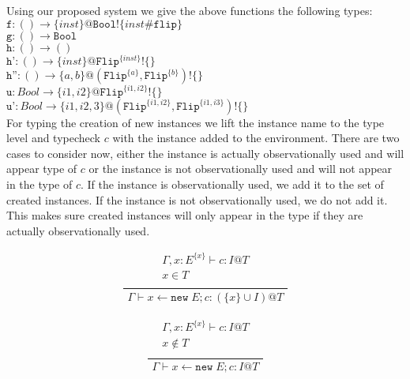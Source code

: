 \documentclass[12pt]{article}
\begin{document}
Using our proposed system we give the above functions the following types:\\
$\texttt{f} : () \rightarrow \{inst\}@\texttt{Bool}!\{inst\#\texttt{flip}\}$\\
$\texttt{g} : () \rightarrow \texttt{Bool}$\\
$\texttt{h} : () \rightarrow ()$\\
$\texttt{h'} : () \rightarrow \{inst\}@\texttt{Flip}^{\{inst\}}!\{\}$\\
$\texttt{h''} : () \rightarrow \{a, b\}@(\texttt{Flip}^{\{a\}},\texttt{Flip}^{\{b\}})!\{\}$\\
$\texttt{u} : Bool \rightarrow \{i1, i2\}@\texttt{Flip}^{\{i1, i2\}}!\{\}$\\
$\texttt{u'} : Bool \rightarrow \{i1, i2, 3\}@(\texttt{Flip}^{\{i1, i2\}}, \texttt{Flip}^{\{i1, i3\}})!\{\}$\\

For typing the creation of new instances we lift the instance name to the type level and typecheck $c$ with the instance added to the environment.
There are two cases to consider now, either the instance is actually observationally used and will appear type of $c$ or the instance is not observationally used and will not appear in the type of $c$.
If the instance is observationally used, we add it to the set of created instances.
If the instance is not observationally used, we do not add it.
This makes sure created instances will only appear in the type if they are actually observationally used.
\begin{minipage}{0.5\textwidth}
\[\frac{
	\begin{array}{l}
	\Gamma , x : E^{\{x\}} \vdash c : I@T \\
	x \in T \\
	\end{array}
}{
	\begin{array}{l}
	\Gamma \vdash x \leftarrow \texttt{new} \; E ; c : (\{x\} \cup I)@T
	\end{array}
}\]
\end{minipage}
\begin{minipage}{0.5\textwidth}
\[\frac{
	\begin{array}{l}
	\Gamma , x : E^{\{x\}} \vdash c : I@T \\
	x \notin T \\
	\end{array}
}{
	\begin{array}{l}
	\Gamma \vdash x \leftarrow \texttt{new} \; E ; c : I@T
	\end{array}
}\]
\end{minipage}
\end{document}
